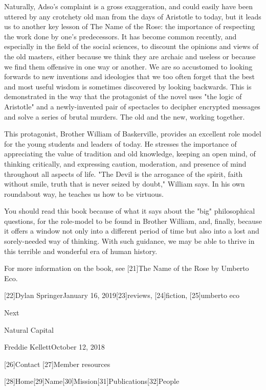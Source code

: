    Naturally, Adso's complaint is a gross exaggeration, and could easily
   have been uttered by any crotchety old man from the days of Aristotle
   to today, but it leads us to another key lesson of The Name of the
   Rose: the importance of respecting the work done by one's predecessors.
   It has become common recently, and especially in the field of the
   social sciences, to discount the opinions and views of the old masters,
   either because we think they are archaic and useless or because we find
   them offensive in one way or another. We are so accustomed to
   looking forwards to new inventions and ideologies that we too often
   forget that the best and most useful wisdom is sometimes discovered by
   looking backwards. This is demonstrated in the way that the protagonist
   of the novel uses "the logic of Aristotle" and a newly-invented pair of
   spectacles to decipher encrypted messages and solve a series of brutal
   murders. The old and the new, working together.

   This protagonist, Brother William of Baskerville, provides an excellent
   role model for the young students and leaders of today. He stresses the
   importance of appreciating the value of tradition and old knowledge,
   keeping an open mind, of thinking critically, and expressing caution,
   moderation, and presence of mind throughout all aspects of life. "The
   Devil is the arrogance of the spirit, faith without smile, truth that
   is never seized by doubt," William says. In his own roundabout way, he
   teaches us how to be virtuous.

   You should read this book because of what it says about the "big"
   philosophical questions, for the role-model to be found in Brother
   William, and, finally, because it offers a window not only into a
   different period of time but also into a lost and sorely-needed way of
   thinking. With such guidance, we may be able to thrive in this terrible
   and wonderful era of human history.

   For more information on the book, see [21]The Name of the Rose by
   Umberto Eco.

   [22]Dylan SpringerJanuary 16, 2019[23]reviews, [24]fiction, [25]umberto
   eco

   Next

Natural Capital

   Freddie KellettOctober 12, 2018

   [26]Contact
   [27]Member resources

   [28]Home[29]Name[30]Mission[31]Publications[32]People

